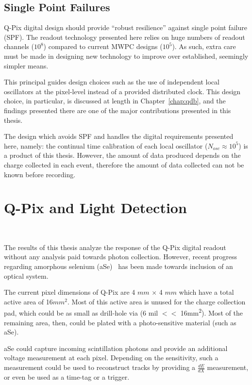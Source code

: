 \subsection{Single Point Failures}

Q-Pix digital design should provide ``robust resilience'' against single point failure (SPF).
The readout technology presented here relies on huge numbers of readout channels ($10^{8}$) compared to current MWPC designs ($10^{5}$).
As such, extra care must be made in designing new technology to improve over established, seemingly simpler means.

This principal guides design choices such as the use of independent local oscillators at the pixel-level instead of a provided distributed clock.
This design choice, in particular, is discussed at length in Chapter~\ref{chap:qdb}, and the findings presented there are one of the major contributions presented in this thesis.

The design which avoids SPF and handles the digital requirements presented here, namely: the continual time calibration of each local oscillator ($N_{osc} \approx 10^{5}$) is a product of this thesis.
However, the amount of data produced depends on the charge collected in each event, therefore the amount of data collected can not be known before recording.

\section{Q-Pix and Light Detection}~\label{sec:qpix_photonics}

The results of this thesis analyze the response of the Q-Pix digital readout without any analysis paid towards photon collection.
However, recent progress regarding amorphous selenium (aSe)~\citep{https://doi.org/10.48550/arxiv.2207.11127} has been made towards inclusion of an optical system.

The current pixel dimensions of Q-Pix are 4 $\unit{mm}$ $\times$ 4 $\unit{mm} $ which have a total active area of 16$\unit{mm^{2}}$.
Most of this active area is unused for the charge collection pad, which could be as small as drill-hole via (6 mil $<<$ 16\unit{mm^2}).
Most of the remaining area, then, could be plated with a photo-sensitive material (such as aSe).

aSe could capture incoming scintillation photons and provide an additional voltage measurement at each pixel.
Depending on the sensitivity, such a measurement could be used to reconstruct tracks by providing a $\frac{dE}{dX}$ measurement, or even be used as a time-tag or a trigger.


